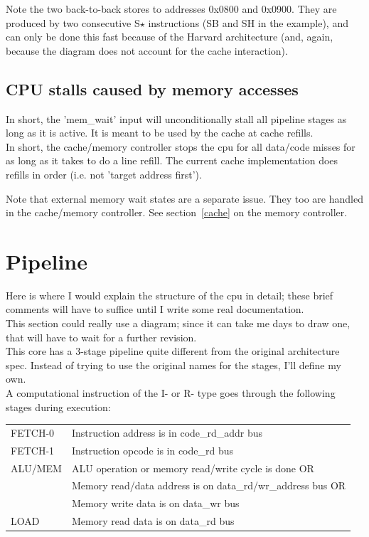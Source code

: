     Note the two back-to-back stores to addresses 0x0800 and 0x0900. They are
    produced by two consecutive S$\star$ instructions (SB and SH in the example),
    and can only be done this fast because of the Harvard architecture (and,
    again, because the diagram does not account for the cache interaction).
    
    
\subsection{CPU stalls caused by memory accesses}
\label{memory_cpu_stalls}

    In short, the 'mem\_wait' input will unconditionally stall all pipeline
    stages as long as it is active. It is meant to be used by the cache at cache 
    refills.\\

    In short, the cache/memory controller stops the cpu for all data/code 
    misses for as long as it takes to do a line refill. The current cache 
    implementation does refills in order (i.e. not 'target address first').

    Note that external memory wait states are a separate issue. They too are 
    handled in the cache/memory controller. See section~\ref{cache} on the memory
    controller.

\section{Pipeline}
\label{pipeline}

    Here is where I would explain the structure of the cpu in detail; these 
    brief comments will have to suffice until I write some real documentation.\\
    
    This section could really use a diagram; since it can take me days to draw 
    one, that will have to wait for a further revision.\\
    
    This core has a 3-stage pipeline quite different from the original 
    architecture spec. Instead of trying to use the original names for the
    stages, I'll define my own.\\
    
    A computational instruction of the I- or R- type goes through the following
    stages during execution:\\

    \begin{tabular}{ l l }
        FETCH-0   & Instruction address is in code\_rd\_addr bus\\
        FETCH-1   & Instruction opcode is in code\_rd bus\\
        ALU/MEM   & ALU operation or memory read/write cycle is done OR\\
                  &   Memory read/data address is on data\_rd/wr\_address bus OR\\
                  &   Memory write data is on data\_wr bus\\
        LOAD      & Memory read data is on data\_rd bus
    \end{tabular}\\        
    
